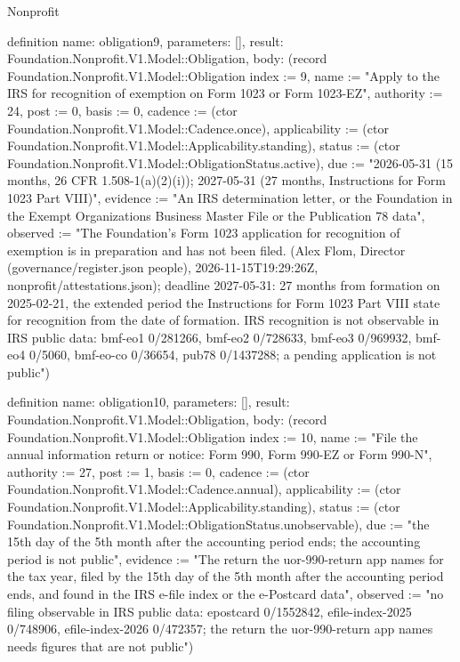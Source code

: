 \begin{lexlean}{Nonprofit}
\begin{semanticmodule}
definition{
  name: obligation9,
  parameters: [],
  result: Foundation.Nonprofit.V1.Model::Obligation,
  body: (record Foundation.Nonprofit.V1.Model::Obligation {index := 9, name := "Apply to the IRS for recognition of exemption on Form 1023 or Form 1023-EZ", authority := 24, post := 0, basis := 0, cadence := (ctor Foundation.Nonprofit.V1.Model::Cadence.once), applicability := (ctor Foundation.Nonprofit.V1.Model::Applicability.standing), status := (ctor Foundation.Nonprofit.V1.Model::ObligationStatus.active), due := "2026-05-31 (15 months, 26 CFR 1.508-1(a)(2)(i)); 2027-05-31 (27 months, Instructions for Form 1023 Part VIII)", evidence := "An IRS determination letter, or the Foundation in the Exempt Organizations Business Master File or the Publication 78 data", observed := "The Foundation's Form 1023 application for recognition of exemption is in preparation and has not been filed. (Alex Flom, Director (governance/register.json people), 2026-11-15T19:29:26Z, nonprofit/attestations.json); deadline 2027-05-31: 27 months from formation on 2025-02-21, the extended period the Instructions for Form 1023 Part VIII state for recognition from the date of formation. IRS recognition is not observable in IRS public data: bmf-eo1 0/281266, bmf-eo2 0/728633, bmf-eo3 0/969932, bmf-eo4 0/5060, bmf-eo-co 0/36654, pub78 0/1437288; a pending application is not public"})
}

definition{
  name: obligation10,
  parameters: [],
  result: Foundation.Nonprofit.V1.Model::Obligation,
  body: (record Foundation.Nonprofit.V1.Model::Obligation {index := 10, name := "File the annual information return or notice: Form 990, Form 990-EZ or Form 990-N", authority := 27, post := 1, basis := 0, cadence := (ctor Foundation.Nonprofit.V1.Model::Cadence.annual), applicability := (ctor Foundation.Nonprofit.V1.Model::Applicability.standing), status := (ctor Foundation.Nonprofit.V1.Model::ObligationStatus.unobservable), due := "the 15th day of the 5th month after the accounting period ends; the accounting period is not public", evidence := "The return the uor-990-return app names for the tax year, filed by the 15th day of the 5th month after the accounting period ends, and found in the IRS e-file index or the e-Postcard data", observed := "no filing observable in IRS public data: epostcard 0/1552842, efile-index-2025 0/748906, efile-index-2026 0/472357; the return the uor-990-return app names needs figures that are not public"})
}


\end{semanticmodule}
\end{lexlean}
